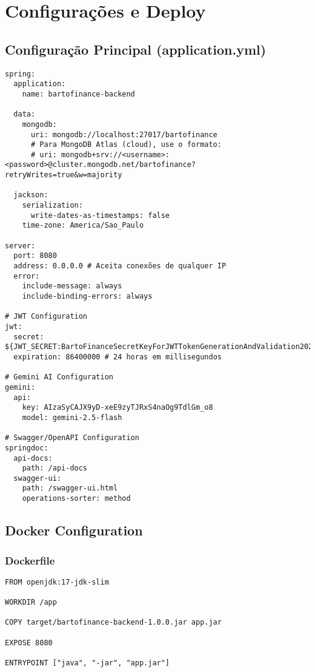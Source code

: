 \documentclass[12pt,a4paper]{article}
\begin{document}
\section{Configurações e Deploy}

\subsection{Configuração Principal (application.yml)}

\begin{lstlisting}[caption=application.yml - Configurações Principais]
spring:
  application:
    name: bartofinance-backend
  
  data:
    mongodb:
      uri: mongodb://localhost:27017/bartofinance
      # Para MongoDB Atlas (cloud), use o formato:
      # uri: mongodb+srv://<username>:<password>@cluster.mongodb.net/bartofinance?retryWrites=true&w=majority
  
  jackson:
    serialization:
      write-dates-as-timestamps: false
    time-zone: America/Sao_Paulo

server:
  port: 8080
  address: 0.0.0.0 # Aceita conexões de qualquer IP
  error:
    include-message: always
    include-binding-errors: always

# JWT Configuration
jwt:
  secret: ${JWT_SECRET:BartoFinanceSecretKeyForJWTTokenGenerationAndValidation2024MustBeAtLeast256BitsLong}
  expiration: 86400000 # 24 horas em millisegundos

# Gemini AI Configuration
gemini:
  api:
    key: AIzaSyCAJX9yD-xeE9zyTJRxS4naOg9TdlGm_o8
    model: gemini-2.5-flash

# Swagger/OpenAPI Configuration
springdoc:
  api-docs:
    path: /api-docs
  swagger-ui:
    path: /swagger-ui.html
    operations-sorter: method
\end{lstlisting}

\subsection{Docker Configuration}

\subsubsection{Dockerfile}

\begin{lstlisting}[caption=Dockerfile]
FROM openjdk:17-jdk-slim

WORKDIR /app

COPY target/bartofinance-backend-1.0.0.jar app.jar

EXPOSE 8080

ENTRYPOINT ["java", "-jar", "app.jar"]
\end{lstlisting}
\end{document}
